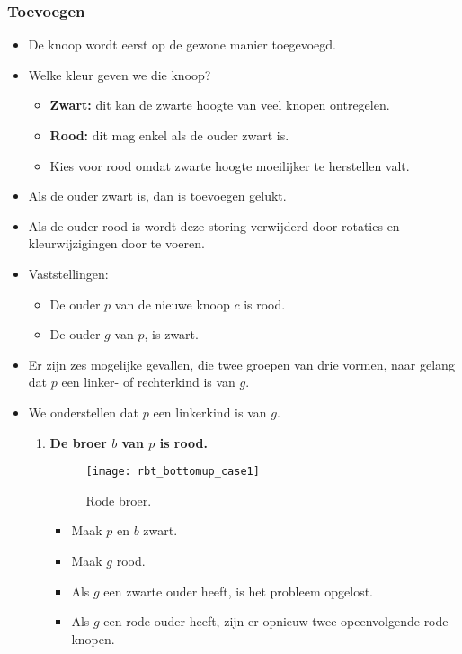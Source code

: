 \subsubsection{Toevoegen}
\begin{itemize}
    \item De knoop wordt eerst op de gewone manier toegevoegd.
    \item Welke kleur geven we die knoop?
    \begin{itemize}
        \item \textbf{Zwart:} dit kan de zwarte hoogte van veel knopen ontregelen.
        \item \textbf{Rood:} dit mag enkel als de ouder zwart is.
        \item Kies voor rood omdat zwarte hoogte moeilijker te herstellen valt.
    \end{itemize}
    \item Als de ouder zwart is, dan is toevoegen gelukt.
    \item Als de ouder rood is wordt deze storing verwijderd door rotaties en kleurwijzigingen door te voeren.
    \item Vaststellingen:
    \begin{itemize}
        \item De ouder $p$ van de nieuwe knoop $c$ is rood.
        \item De ouder $g$ van $p$, is zwart.
    \end{itemize}
    \item Er zijn zes mogelijke gevallen, die twee groepen van drie vormen, naar gelang dat $p$ een linker- of rechterkind is van $g$. 
    \item We onderstellen dat $p$ een linkerkind is van $g$. 
    \begin{enumerate}
        \item \textbf{De broer $b$ van $p$ is rood.}
        \begin{figure}[ht]
            \centering
            \texttt{[image: rbt\_bottomup\_case1]}
            \caption{Rode broer.}
            \label{fig:rbt_bottomup_case1}
        \end{figure}
        \begin{itemize}
            \item Maak $p$ en $b$ zwart.
            \item Maak $g$ rood.
            \item Als $g$ een zwarte ouder heeft, is het probleem opgelost.
            \item Als $g$ een rode ouder heeft, zijn er opnieuw twee opeenvolgende rode knopen.

\end{itemize}
\end{enumerate}
\end{itemize}

